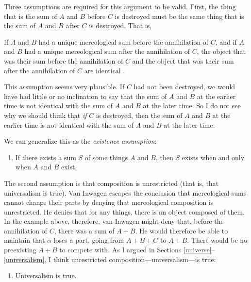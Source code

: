 \documentclass[12pt,twoside]{reedfancy}
\newenvironment{squote}{%
	\begin{spacing}{1}
	\begin{list}{}{%
	\setlength{\labelwidth}{0pt}%
	\rightmargin\leftmargin%
	}
	\item\relax
	}{%
	\end{list}%
	\end{spacing}
	}
\begin{document}
\begin{spacing}{1.25}
Three assumptions are required for this argument to be valid.  First,
the thing that is the sum of $A$ and $B$ before $C$ is destroyed must
be the same thing that is the sum of $A$ and $B$ after $C$ is
destroyed.  That is,

\begin{squote}
If $A$ and $B$ had a unique mereological sum before the annihilation
of $C$, and if $A$ and $B$ had a unique mereological sum after the
annihilation of $C$, the object that was their sum before the
annihilation of $C$ and the object that was their sum after the
annihilation of $C$ are identical \citep[629]{inwagen2006}.
\end{squote}

This assumption seems very plausible.  If $C$ had not been destroyed,
we would have had little or no inclination to say that the sum of $A$
and $B$ at the earlier time is not identical with the sum of $A$ and
$B$ at the later time.  So I do not see why we should think that {\em
  if} $C$ is destroyed, then the sum of $A$ and $B$ at the earlier
time is not identical with the sum of $A$ and $B$ at the later time.

We can generalize this as the {\em existence assumption}:

\begin{enumerate}[ref=(\arabic*)]
  \item If there exists a sum $S$ of some things $A$ and $B$, then $S$
    exists when and only when $A$ and $B$ exist. \label{ass-ex}
\end{enumerate}

The second assumption is that composition is unrestricted (that is,
that universalism is true).  Van Inwagen escapes the conclusion that
mereological sums cannot change their parts by denying that
mereological composition is unrestricted.  He denies that for any
things, there is an object composed of them.  In the example above,
therefore, van Inwagen might deny that, before the annihilation of
$C$, there was a sum of $A + B$.  He would therefore be able to
maintain that $\alpha$ loses a part, going from $A + B + C$ to $A +
B$.  There would be no preexisting $A + B$ to compete with.  As I
argued in Sections \ref{universe}--\ref{universalism}, I think
unrestricted composition---universalism---is true:

\begin{enumerate}[start=2, ref=(\arabic*)]
  \item Universalism is true. \label{ass-uni}
\end{enumerate}


\end{spacing}
\end{document}
